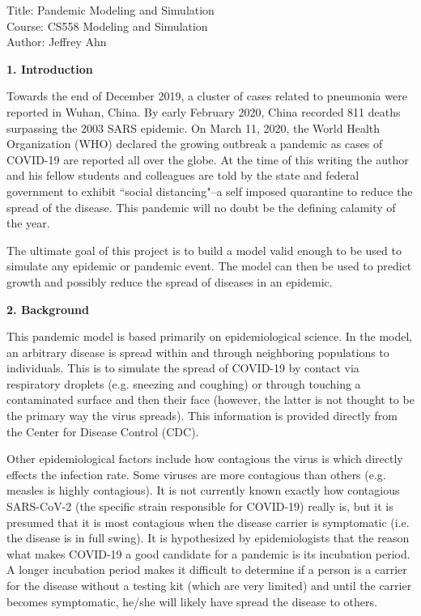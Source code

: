 \documentclass[a4paper]{article}
\begin{document}
\begin{titlepage}
  \begin{center}
    Title: Pandemic Modeling and Simulation \\
    Course: CS558 Modeling and Simulation \\
    Author: Jeffrey Ahn \\
  \end{center}
\end{titlepage}

\newpage

\begin{center}
\textbf{1. Introduction}
\end{center}

Towards the end of
December 2019, a cluster of cases related to pneumonia were reported in
Wuhan, China. By early February 2020, China recorded 811 deaths surpassing the 2003 SARS
epidemic. On March 11, 2020, the World Health Organization (WHO) declared the
growing outbreak a pandemic as cases of COVID-19 are reported all over the
globe. At the time of this writing the author and his fellow students and
colleagues are told by the state and federal government to exhibit ``social 
distancing"--a self imposed quarantine to reduce the spread of the disease. This 
pandemic will no doubt be the defining calamity of the year.

The ultimate goal of this project is to build a model valid enough to be used
to simulate any epidemic or pandemic event. The model can then be 
used to predict growth and possibly reduce the spread of diseases in an
epidemic.

\begin{center}
  \textbf{2. Background}
\end{center}

This pandemic model is based primarily on epidemiological science. In the model,
an arbitrary disease is spread within and through neighboring populations to
individuals. This is to simulate the spread of COVID-19
by contact via respiratory droplets (e.g. sneezing and coughing) or through touching a 
contaminated surface and then
their face (however, the latter is not thought to be the primary way the virus spreads).
This information is provided directly from the Center for Disease Control (CDC). 

Other epidemiological factors include how contagious the virus is which 
directly effects the infection rate. Some viruses are more
contagious than others (e.g. measles is highly contagious). It is not currently
known exactly how contagious SARS-CoV-2 (the specific strain responsible for COVID-19)
really is, but it is presumed that it is most contagious when the disease
carrier is symptomatic (i.e. the disease is in full swing). It is hypothesized by 
epidemiologists that the reason what makes COVID-19 a good candidate for a pandemic is 
its incubation period. A longer incubation period makes it difficult to
determine if a person is a carrier for the disease without a testing kit (which
are very limited) and until the carrier becomes symptomatic, he/she will likely
have spread the disease to others.
\end{document}
